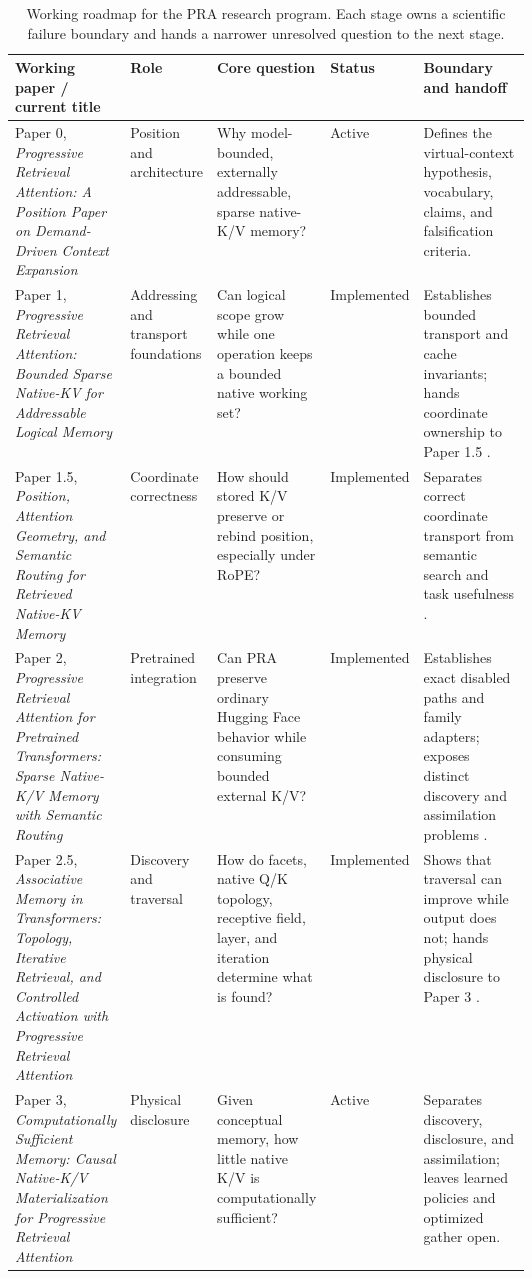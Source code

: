 \documentclass[11pt]{article}
\begin{document}
\begin{table}[p]
\centering
\begingroup
\scriptsize
\setlength{\tabcolsep}{3pt}
\renewcommand{\arraystretch}{1.08}
\caption{Working roadmap for the PRA research program.  Each stage owns a scientific failure
boundary and hands a narrower unresolved question to the next stage.}
\label{tab:program-roadmap}
\begin{tabularx}{\textwidth}{@{}P{0.17\linewidth}P{0.12\linewidth}P{0.21\linewidth}P{0.105\linewidth}X@{}}
\toprule
Working paper / current title & Role & Core question & Status & Boundary and handoff \\
\midrule
Paper 0, \emph{Progressive Retrieval Attention: A Position Paper on Demand-Driven Context Expansion}
& Position and architecture
& Why model-bounded, externally addressable, sparse native-K/V memory?
& Active
& Defines the virtual-context hypothesis, vocabulary, claims, and falsification criteria. \\
Paper 1, \emph{Progressive Retrieval Attention: Bounded Sparse Native-KV for Addressable Logical Memory}
& Addressing and transport foundations
& Can logical scope grow while one operation keeps a bounded native working set?
& Implemented
& Establishes bounded transport and cache invariants; hands coordinate ownership to Paper 1.5
\cite{simao2026standalone}. \\
Paper 1.5, \emph{Position, Attention Geometry, and Semantic Routing for Retrieved Native-KV Memory}
& Coordinate correctness
& How should stored K/V preserve or rebind position, especially under RoPE?
& Implemented
& Separates correct coordinate transport from semantic search and task usefulness
\cite{simao2026position}. \\
Paper 2, \emph{Progressive Retrieval Attention for Pretrained Transformers: Sparse Native-K/V Memory with Semantic Routing}
& Pretrained integration
& Can PRA preserve ordinary Hugging Face behavior while consuming bounded external K/V?
& Implemented
& Establishes exact disabled paths and family adapters; exposes distinct discovery and assimilation
problems \cite{simao2026hf}. \\
Paper 2.5, \emph{Associative Memory in Transformers: Topology, Iterative Retrieval, and Controlled Activation with Progressive Retrieval Attention}
& Discovery and traversal
& How do facets, native Q/K topology, receptive field, layer, and iteration determine what is found?
& Implemented
& Shows that traversal can improve while output does not; hands physical disclosure to Paper 3
\cite{simao2026iterative}. \\
Paper 3, \emph{Computationally Sufficient Memory: Causal Native-K/V Materialization for Progressive Retrieval Attention}
& Physical disclosure
& Given conceptual memory, how little native K/V is computationally sufficient?
& Active
& Separates discovery, disclosure, and assimilation; leaves learned policies and optimized gather open. \\
\bottomrule
\end{tabularx}
\endgroup
\end{table}
\end{document}
